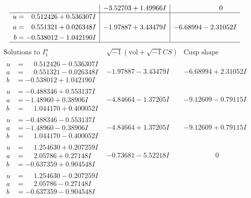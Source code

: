 \documentclass[1p]{elsarticle_modified}
\theoremstyle{definition}
\newcommand{\I}{\sqrt{-1}}
\begin{document}
$$\begin{array}{c|c|c}
 & -3.52703 + 1.49966 I & \phantom{-0.000000 } 0 \\ \hline\begin{aligned}
u &= \phantom{-}0.512426 + 0.536307 I \\
a &= \phantom{-}0.551321 + 0.026348 I \\
b &= -0.538012 - 1.042190 I\end{aligned}
 & -1.97887 + 3.43479 I & -6.68994 - 2.31052 I\\
 \hline 
 \end{array}$$\newpage$$\begin{array}{c|c|c}  
\text{Solutions to }I^u_{1}& \I (\text{vol} + \sqrt{-1}CS) & \text{Cusp shape}\\
 \hline 
\begin{aligned}
u &= \phantom{-}0.512426 - 0.536307 I \\
a &= \phantom{-}0.551321 - 0.026348 I \\
b &= -0.538012 + 1.042190 I\end{aligned}
 & -1.97887 - 3.43479 I & -6.68994 + 2.31052 I \\ \hline\begin{aligned}
u &= -0.488346 + 0.553137 I \\
a &= -1.48960 + 0.38906 I \\
b &= \phantom{-}1.044170 + 0.400052 I\end{aligned}
 & -4.84664 - 1.37205 I & -9.12609 - 0.79115 I \\ \hline\begin{aligned}
u &= -0.488346 - 0.553137 I \\
a &= -1.48960 - 0.38906 I \\
b &= \phantom{-}1.044170 - 0.400052 I\end{aligned}
 & -4.84664 + 1.37205 I & -9.12609 + 0.79115 I \\ \hline\begin{aligned}
u &= \phantom{-}1.254630 + 0.207259 I \\
a &= \phantom{-}2.05786 + 0.27148 I \\
b &= -0.637359 + 0.904548 I\end{aligned}
 & -0.73681 - 5.52218 I & \phantom{-0.000000 } 0 \\ \hline\begin{aligned}
u &= \phantom{-}1.254630 - 0.207259 I \\
a &= \phantom{-}2.05786 - 0.27148 I \\
b &= -0.637359 - 0.904548 I\end{aligned}

\end{array}$$
\end{document}
